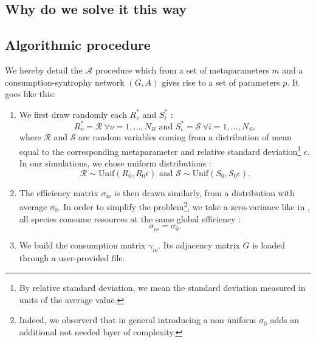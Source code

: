 \documentclass[12pt]{report}
\begin{document}
\subsection{Why do we solve it this way}\label{sec: explanation solve for d and m}

\subsection{Algorithmic procedure}\label{sec : feasibility methods algorithmic procedure}
We hereby detail the $\mathcal{A}$ procedure which from a set of metaparameters $m$ and a consumption-syntrophy network $(G,A)$ gives rise to a set of parameters $p$. It goes like this:
\begin{enumerate}
  \item We first draw randomly each $R^*_\nu$
  and $S^*_i$ :
  \begin{equation}
     R^*_\nu = \mathcal{R} \ \forall \nu=1, \dots, N_R\text{ and }  S^*_i = \mathcal{S} \ \forall i=1, \dots, N_S,
  \end{equation}
  where $\mathcal{R}$ and $\mathcal{S}$ are random variables coming from a distribution of mean equal to the corresponding metaparameter and relative standard deviation\footnote{By relative standard deviation, we mean the standard deviation measured in units of the average value.} $\epsilon$. In our simulations, we chose uniform distributions :
  \begin{equation}
  \mathcal{R} \sim \text{Unif}(R_0, R_0 \epsilon) \text{ and } \mathcal{S} \sim \text{Unif}(S_0, S_0\epsilon).
  \end{equation}
  \item The efficiency matrix $\sigma_{i\nu}$ is then drawn similarly, from a distribution with average $\sigma_0$. In order to simplify the problem\footnote{Indeed, we observerd that in general introducing a non uniform $\sigma_0$ adds an additional not needed layer of complexity.}, we take a zero-variance like \citeauthor{butler_stability_2018} in \cite{butler_stability_2018}, \ie all species consume resources at the same global efficiency :
  \begin{equation}
    \sigma_{i\nu} = \sigma_0.
  \end{equation}
  \item We build the consumption matrix $\gamma_{i\nu}$. Its adjacency matrix $G$ is loaded through a user-provided file.

\end{enumerate}
\end{document}
